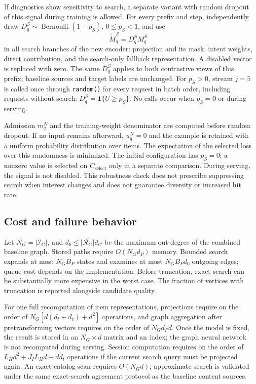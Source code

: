 \documentclass[12pt,a4paper]{article}
\newcommand{\code}[1]{{\ttfamily\small\nolinkurl{#1}}}
\newcommand{\ind}{\mathbf 1}
\theoremstyle{plainru}
\begin{document}
If diagnostics show sensitivity to search, a separate
variant with random dropout of this signal during training is allowed.
For every prefix and step, independently draw
$D_q^S\sim\operatorname{Bernoulli}(1-p_S)$, $0\le p_S<1$, and use
\begin{equation}\label{eq:modern-search-dropout}
\widetilde M_q^S=D_q^SM_q^S
\end{equation}
in all search branches of the new encoder: projection and its mask,
intent weights, direct contribution, and the search-only fallback
representation. A disabled vector is replaced with zero.
The same $D_q^S$ applies to both contrastive views
of this prefix; baseline sources and target labels are unchanged.
For $p_S>0$, stream $j=5$ is called once through \code{random()}
for every request in batch order, including requests without search;
$D_q^S=\ind\{U\ge p_S\}$. No calls occur when $p_S=0$ or during serving.

Admission $m_q^N$ and the training-weight denominator are computed before random
dropout. If no input remains afterward, $u_q^N=0$ and the example
is retained with a uniform probability distribution over items.
The expectation of the selected loss over this randomness is minimized.
The initial configuration has $p_S=0$; a nonzero value is selected
on $C_{\mathrm{select}}$ only in a separate comparison. During serving, the signal is not disabled. This robustness check
does not prescribe suppressing search when interest changes and does not guarantee
diversity or increased hit rate.

\subsection{Cost and failure behavior}
\label{sec:modern-cost}

Let $N_G=|\mathcal I_G|$, and
$d_0\le|\mathcal R_G|d_G$ be the maximum out-degree
of the combined baseline graph.
Stored paths require $O(N_Gd_P)$ memory.
Bounded search expands at most $N_GB_P$ states
and examines at most $N_GB_Pd_0$ outgoing edges;
queue cost depends on the implementation.
Before truncation, exact search can be substantially more expensive in the worst case.
The fraction of vertices with truncation is reported alongside candidate quality.

For one full recomputation of item representations,
projections require on the order of
$N_G[d(d_t+d_v)+d^2]$ operations,
and graph aggregation after pretransforming
vectors requires on the order of $N_Gd_Pd$.
Once the model is fixed, the result is stored in an $N_G\times d$ matrix
and an index; the graph neural network is not recomputed during serving.
Session computation requires on the order of
$L_Hd^2+J_IL_Hd+d d_t$ operations
if the current search query must be projected again.
An exact catalog scan requires $O(N_Gd)$;
approximate search is validated under the same exact-search agreement
protocol as the baseline content sources.
\end{document}
